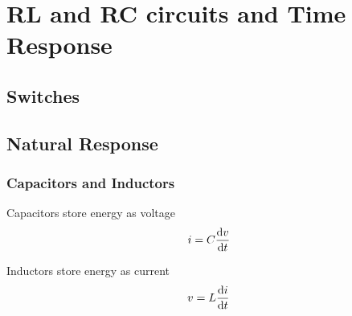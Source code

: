 \chapter{RL and RC circuits and Time Response}
\label{cha:rl_rc_timeresponse}
    \section{Switches}
    \section{Natural Response}
        \subsection{Capacitors and Inductors}
            \begin{minipage}{0.5\linewidth}
                Capacitors store energy as voltage
                \begin{equation*}
                    i = C \odv{v}{t}
                \end{equation*}
            \end{minipage}
            \begin{minipage}{0.5\linewidth}
                Inductors store energy as current
                \begin{equation*}
                    v = L \odv{i}{t}
                \end{equation*}
            \end{minipage}
